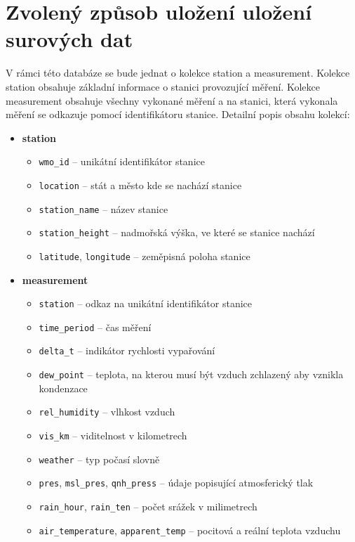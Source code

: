 \documentclass[11pt,a4paper,titlepage]{extarticle}
\begin{document}
\section{Zvolený způsob uložení uložení surových dat}
V rámci této databáze se bude jednat o kolekce station a measurement. Kolekce station obsahuje základní informace o stanici provozující měření. Kolekce measurement obsahuje všechny vykonané měření a na stanici, která vykonala měření se odkazuje pomocí identifikátoru stanice. Detailní popis obsahu kolekcí:
\begin{itemize}
	\item \textbf{station}
	\begin{itemize}[label=\textperiodcentered]
    	\item \texttt{wmo\_id} -- unikátní identifikátor stanice
        \item \texttt{location} -- stát a město kde se nachází stanice
        \item \texttt{station\_name} -- název stanice
        \item \texttt{station\_height} -- nadmořská výška, ve které se stanice nachází
        \item \texttt{latitude}, \texttt{longitude} -- zeměpisná poloha stanice
    \end{itemize}
	\item \textbf{measurement}
	\begin{itemize}[label=\textperiodcentered]
        \item \texttt{station} -- odkaz na unikátní identifikátor stanice
        \item \texttt{time\_period} -- čas měření
        \item \texttt{delta\_t} -- indikátor rychlosti vypařování
        \item \texttt{dew\_point} -- teplota, na kterou musí být vzduch zchlazený aby vznikla kondenzace
        \item \texttt{rel\_humidity} -- vlhkost vzduch
        \item \texttt{vis\_km} -- viditelnost v kilometrech
        \item \texttt{weather} -- typ počasí slovně
        \item \texttt{pres}, \texttt{msl\_pres}, \texttt{qnh\_press} -- údaje popisující atmosferický tlak
        \item \texttt{rain\_hour}, \texttt{rain\_ten} -- počet srážek v milimetrech
        \item \texttt{air\_temperature}, \texttt{apparent\_temp} -- pocitová a reální teplota vzduchu

\end{itemize}
\end{itemize}
\end{document}
